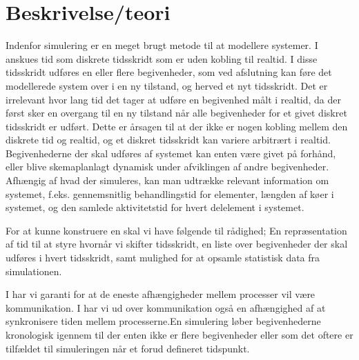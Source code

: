 \section{Beskrivelse/teori} \label{sec:des-teori}

\begin{shaded}
Indenfor simulering er \des en meget brugt metode til at modellere systemer. I 
\des anskues tid som diskrete tidsskridt som er uden kobling til realtid. I 
disse tidsskridt udføres en eller flere begivenheder, som ved afslutning kan 
føre det modellerede system over i en ny tilstand, og herved et nyt tidsskridt. 
Det er irrelevant hvor lang tid det tager at udføre en begivenhed målt i 
realtid, da der først sker en overgang til en ny tilstand når alle begivenheder 
for et givet diskret tidsskridt er udført. Dette er årsagen til at der ikke er 
nogen kobling mellem den diskrete tid og realtid, og et diskret tidsskridt kan 
variere arbitrært i realtid. Begivenhederne der skal udføres af systemet kan 
enten være givet på forhånd, eller blive skemaplanlagt dynamisk under afviklingen 
af andre begivenheder. 
Afhængig af hvad der simuleres, kan man udtrække relevant information om systemet, f.eks. gennemsnitlig behandlingstid for elementer, længden af køer i systemet, og den samlede aktivitetstid for hvert delelement i systemet. 


For at kunne konstruere en \des skal vi have følgende til rådighed; En repræsentation af tid til at styre hvornår vi skifter tidsskridt, en liste over begivenheder der skal udføres i hvert tidsskridt, samt mulighed for at opsamle statistisk data fra simulationen. 

    
I \csp har vi garanti for at de eneste afhængigheder mellem processer vil være kommunikation. I \des har vi ud over kommunikation også en afhængighed af at synkronisere tiden mellem processerne.En simulering løber begivenhederne kronologisk igennem til der enten ikke er flere begivenheder eller som det oftere er tilfældet til simuleringen når et forud defineret tidspunkt.

\end{shaded}
